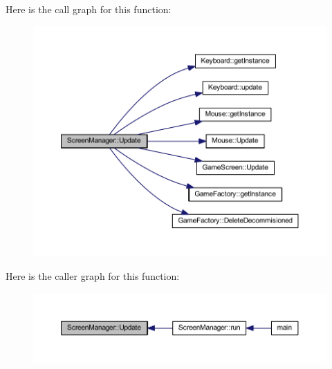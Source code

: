 Here is the call graph for this function\-:\nopagebreak
\begin{figure}[H]
\begin{center}
\leavevmode
\includegraphics[width=350pt]{class_screen_manager_acdc42b918d0c758bba56247977003210_cgraph}
\end{center}
\end{figure}




Here is the caller graph for this function\-:\nopagebreak
\begin{figure}[H]
\begin{center}
\leavevmode
\includegraphics[width=350pt]{class_screen_manager_acdc42b918d0c758bba56247977003210_icgraph}
\end{center}
\end{figure}




